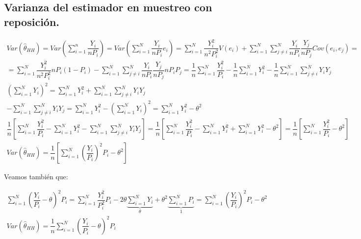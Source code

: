 \subsection{Varianza del estimador en muestreo con reposici\'on.}

\[
\begin{array}{c}
Var\left(\hat{\theta}_{HH}\right)=Var\left(\sum_{i=1}^{n}\dfrac{Y_{i}}{nP_{i}}\right)=Var\left(\sum_{i=1}^{N}\dfrac{Y_{i}}{nP_{i}}e_{i}\right)=\sum_{i=1}^{N}\dfrac{Y_{i}^{2}}{n^{2}P_{i}^{2}}V\left(e_{i}\right)+\sum_{i=1}^{N}\sum_{j\neq i}^{N}\dfrac{Y_{i}}{nP_{i}}\dfrac{Y_{j}}{nP_{j}}Cov\left(e_{i},e_{j}\right)=\\
=\sum_{i=1}^{N}\dfrac{Y_{i}^{2}}{n^{2}P_{i}^{2}}nP_{i}\left(1-P_{i}\right)-\sum_{i=1}^{N}\sum_{j\neq i}^{N}\dfrac{Y_{i}}{nP_{i}}\dfrac{Y_{j}}{nP_{j}}nP_{i}P_{j}=\dfrac{1}{n}\sum_{i=1}^{N}\dfrac{Y_{i}^{2}}{P_{i}}-\dfrac{1}{n}\sum_{i=1}^{N}Y_{i}^{2}-\dfrac{1}{n}\sum_{i=1}^{N}\sum_{j\neq i}^{N}Y_{i}Y_{j}\\
\left(\sum_{i=1}^{N}Y_{i}\right)^{2}=\sum_{i=1}^{N}Y_{i}^{2}+\sum_{i=1}^{N}\sum_{j\neq i}^{N}Y_{i}Y_{j}\\
-\sum_{i=1}^{N}\sum_{j\neq i}^{N}Y_{i}Y_{j}=\sum_{i=1}^{N}Y_{i}^{2}-\left(\sum_{i=1}^{N}Y_{i}\right)^{2}=\sum_{i=1}^{N}Y_{i}^{2}-\theta^{2}\\
\dfrac{1}{n}\left[\sum_{i=1}^{N}\dfrac{Y_{i}^{2}}{P_{i}}-\sum_{i=1}^{N}Y_{i}^{2}-\sum_{i=1}^{N}\sum_{j\neq i}^{N}Y_{i}Y_{j}\right]=\dfrac{1}{n}\left[\sum_{i=1}^{N}\dfrac{Y_{i}^{2}}{P_{i}}-\sum_{i=1}^{N}Y_{i}^{2}+\sum_{i=1}^{N}Y_{i}^{2}-\theta^{2}\right]=\dfrac{1}{n}\left[\sum_{i=1}^{N}\dfrac{Y_{i}^{2}}{P_{i}}-\theta^{2}\right]\\
Var\left(\hat{\theta}_{HH}\right)=\dfrac{1}{n}\left[\sum_{i=1}^{N}\left(\dfrac{Y_{i}}{P_{i}}\right)^{2}P_{i}-\theta^{2}\right]
\end{array}
\]


Veamos tambi\'en que:

\[
\begin{array}{c}
\sum_{i=1}^{N}\left(\dfrac{Y_{i}}{P_{i}}-\theta\right)^{2}P_{i}=\sum_{i=1}^{N}\dfrac{Y_{i}^{2}}{P_{i}^{2}}P_{i}-2\theta\underbrace{\sum_{i=1}^{N}Y_{i}}_{\theta}+\theta^{2}\underbrace{\sum_{i=1}^{N}P_{i}}_{1}=\sum_{i=1}^{N}\left(\dfrac{Y_{i}}{P_{i}}\right)^{2}P_{i}-\theta^{2}\\
Var\left(\hat{\theta}_{HH}\right)=\dfrac{1}{n}\sum_{i=1}^{N}\left(\dfrac{Y_{i}}{P_{i}}-\theta\right)^{2}P_{i}
\end{array}
\]




